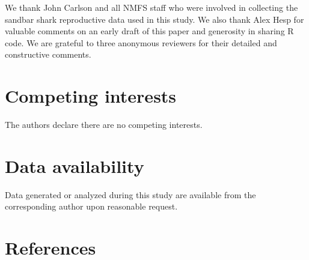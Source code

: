 \documentclass[
]{article}
\begin{document}
We thank John Carlson and all NMFS staff who were involved in collecting the sandbar shark reproductive data used in this study. We also thank Alex Hesp for valuable comments on an early draft of this paper and generosity in sharing R code. We are grateful to three anonymous reviewers for their detailed and constructive comments.

\section{Competing interests}\label{competing-interests}

The authors declare there are no competing interests.

\section{Data availability}\label{data-availability}

Data generated or analyzed during this study are available from the corresponding author upon reasonable request.

\section*{References}\label{references}
\end{document}
